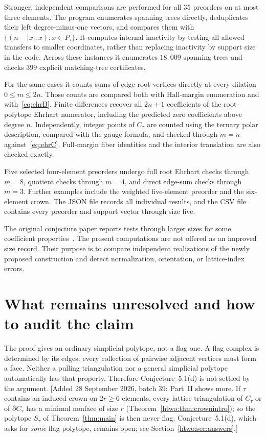 \documentclass[11pt]{article}
\numberwithin{equation}{section}
\theoremstyle{definition}
\begin{document}
Stronger, independent comparisons are performed for all $35$ preorders on
at most three elements. The program enumerates spanning trees directly,
deduplicates their left degree-minus-one vectors, and compares them with
$\{(n-|x|,x):x\in P_\tau\}$. It computes internal inactivity by testing all
allowed transfers to smaller coordinates, rather than replacing inactivity
by support size in the code. Across these instances it enumerates $18{,}009$
spanning trees and checks $399$ explicit matching-tree certificates.

For the same cases it counts sums of edge-root vertices directly at every
dilation $0\leq m\leq2n$. Those counts are compared both with Hall-margin
enumeration and with~\eqref{eq:ehrB}. Finite differences recover all $2n+1$
coefficients of the root-polytope Ehrhart numerator, including the predicted
zero coefficients above degree $n$. Independently, integer points of $C_\tau$
are counted using the ternary polar description, compared with the gauge
formula, and checked through $m=n$ against~\eqref{eq:ehrC}. Full-margin
fiber identities and the interior translation are also checked exactly.

Five selected four-element preorders undergo full root Ehrhart checks through
$m=8$, quotient checks through $m=4$, and direct edge-sum checks through
$m=3$. Further examples include the weighted five-element preorder and the
six-element crown. The JSON file records all individual results, and the CSV
file contains every preorder and support vector through size five.

The original conjecture paper reports tests through larger sizes for some
coefficient properties~\cite{AC}. The present computations are not offered as
an improved size record. Their purpose is to compare independent realizations
of the newly proposed construction and detect normalization, orientation, or
lattice-index errors.

\section{What remains unresolved and how to audit the claim}\label{sec:limits}

The proof gives an ordinary simplicial polytope, not a flag one. A flag complex
is determined by its edges: every collection of pairwise adjacent vertices
must form a face. Neither a pulling triangulation nor a general simplicial
polytope automatically has that property. Therefore Conjecture~5.1(d) is not
settled by the argument.
[Added 28 September 2026, batch 39: Part~II shows more. If $\tau$ contains
an induced crown on $2r\geq6$ elements, every lattice triangulation of
$C_\tau$ or of $\partial C_\tau$ has a minimal nonface of size $r$
(Theorem~\ref{htwo:thm:crownintro}); so the polytope $S_\tau$ of
Theorem~\ref{thm:main} is then never flag. Conjecture~5.1(d), which asks for
\emph{some} flag polytope, remains open; see
Section~\ref{htwo:sec:answers}.]
\end{document}
